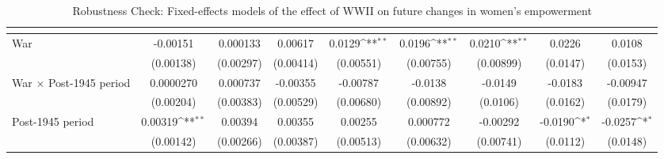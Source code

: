 \begin{table}[htbp]\centering
\def\sym#1{\ifmmode^{#1}\else\(^{#1}\)\fi}
\caption{Robustness Check: Fixed-effects models of the effect of WWII on future changes in women's empowerment \label{fepolemwwII}}
\begin{tabular}{l*{8}{c}}
\hline\hline
                    &&&&&&&&\\
\hline
War            &    -0.00151         &    0.000133         &     0.00617         &      0.0129\sym{**} &      0.0196\sym{**} &      0.0210\sym{**} &      0.0226         &      0.0108         \\
                    &   (0.00138)         &   (0.00297)         &   (0.00414)         &   (0.00551)         &   (0.00755)         &   (0.00899)         &    (0.0147)         &    (0.0153)         \\
[1em]
War $\times$ Post-1945 period&   0.0000270         &    0.000737         &    -0.00355         &    -0.00787         &     -0.0138         &     -0.0149         &     -0.0183         &    -0.00947         \\
                    &   (0.00204)         &   (0.00383)         &   (0.00529)         &   (0.00680)         &   (0.00892)         &    (0.0106)         &    (0.0162)         &    (0.0179)         \\
[1em]
Post-1945 period            &     0.00319\sym{**} &     0.00394         &     0.00355         &     0.00255         &    0.000772         &    -0.00292         &     -0.0190\sym{*}  &     -0.0257\sym{*}  \\
                    &   (0.00142)         &   (0.00266)         &   (0.00387)         &   (0.00513)         &   (0.00632)         &   (0.00741)         &    (0.0112)         &    (0.0148)         \\
[1em]

\end{tabular}
\end{table}

